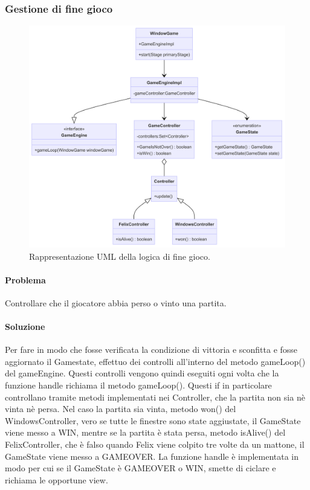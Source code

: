 \documentclass[a4paper,12pt]{report}
\begin{document}
\subsubsection{Gestione di fine gioco}

\begin{figure}[H]
\centering{}
\includegraphics[width=\textwidth]{img/FineGioco.png}
\caption{Rappresentazione UML della logica di fine gioco.}
\end{figure}

\paragraph{Problema} Controllare che il giocatore abbia perso o vinto una partita.

\paragraph{Soluzione} Per fare in modo che fosse verificata la condizione di vittoria e sconfitta e fosse aggiornato il Gamestate, effettuo dei controlli all'interno del metodo gameLoop() del gameEngine. Questi controlli vengono quindi eseguiti ogni volta che la funzione handle richiama il metodo gameLoop(). Questi if in particolare controllano tramite metodi implementati nei Controller, che la partita non sia nè vinta nè persa. Nel caso la partita sia vinta, metodo won() del WindowsController, vero se tutte le finestre sono state aggiustate, il GameState viene messo a WIN, mentre se la partita è stata persa, metodo isAlive() del FelixController, che è falso quando Felix viene colpito tre volte da un mattone, il GameState viene messo a GAMEOVER. La funzione handle è implementata in modo per cui se il GameState è GAMEOVER o WIN, smette di ciclare e richiama le opportune view. 
\end{document}
